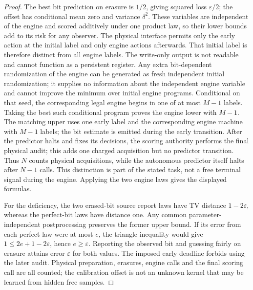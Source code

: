 \begin{proof}
The best bit prediction on erasure is $1/2$, giving squared loss $\varepsilon/2$; the offset has conditional mean zero and variance $\delta^2$. These variables are independent of the engine and scored additively under one product law, so their lower bounds add to its risk for any observer. The physical interface permits only the early action at the initial label and only engine actions afterwards. That initial label is therefore distinct from all engine labels. The write-only output is not readable and cannot function as a persistent register. Any extra bit-dependent randomization of the engine can be generated as fresh independent initial randomization; it supplies no information about the independent engine variable and cannot improve the minimum over initial engine programs. Conditional on that seed, the corresponding legal engine begins in one of at most $M-1$ labels. Taking the best such conditional program proves the engine lower with $M-1$. The matching upper uses one early label and the corresponding engine machine with $M-1$ labels; the bit estimate is emitted during the early transition. After the predictor halts and fixes its decisions, the scoring authority performs the final physical audit; this adds one charged acquisition but no predictor transition. Thus $N$ counts physical acquisitions, while the autonomous predictor itself halts after $N-1$ calls. This distinction is part of the stated task, not a free terminal signal during the engine. Applying the two engine laws gives the displayed formulas.

For the deficiency, the two erased-bit source report laws have TV distance $1-2\varepsilon$, whereas the perfect-bit laws have distance one. Any common parameter-independent postprocessing preserves the former upper bound. If its error from each perfect law were at most $e$, the triangle inequality would give $1\le2e+1-2\varepsilon$, hence $e\ge\varepsilon$. Reporting the observed bit and guessing fairly on erasure attains error $\varepsilon$ for both values. The imposed early deadline forbids using the later audit. Physical preparation, erasures, engine calls and the final scoring call are all counted; the calibration offset is not an unknown kernel that may be learned from hidden free samples.
\end{proof}
